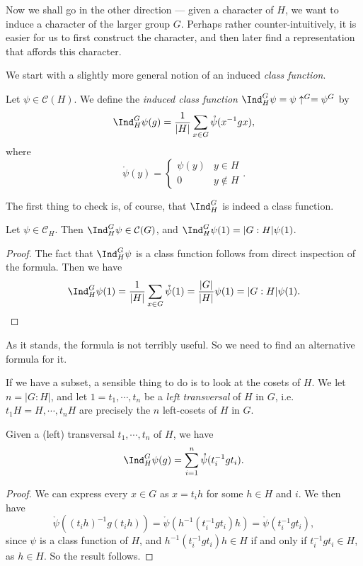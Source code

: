 \documentclass[a4paper]{article}
\begin{document}
Now we shall go in the other direction --- given a character of $H$, we want to induce a character of the larger group $G$. Perhaps rather counter-intuitively, it is easier for us to first construct the character, and then later find a representation that affords this character.

We start with a slightly more general notion of an induced \emph{class function}.
\begin{defi}
  Let $\psi \in \mathcal{C}(H)$. We define the \emph{induced class function} $\Ind^G_H \psi = \psi\uparrow^G = \psi^G$ by
  \[
    \Ind_H^G \psi(g) = \frac{1}{|H|} \sum_{x \in G} \mathring{\psi} (x^{-1}gx),
  \]
  where
  \[
    \mathring{\psi}(y) =
    \begin{cases}
      \psi(y) & y \in H\\
      0 & y \not\in H
    \end{cases}.
  \]
\end{defi}
The first thing to check is, of course, that $\Ind^G_H$ is indeed a class function.

\begin{lemma}
  Let $\psi \in \mathcal{C}_H$. Then $\Ind_H^G \psi \in \mathcal{C}(G)$, and $\Ind_H^G\psi(1) = |G:H| \psi(1)$.
\end{lemma}

\begin{proof}
  The fact that $\Ind_H^G\psi$ is a class function follows from direct inspection of the formula. Then we have
  \[
    \Ind_H^G \psi(1) = \frac{1}{|H|} \sum_{x \in G} \mathring{\psi}(1) = \frac{|G|}{|H|}\psi(1) = |G:H|\psi(1).
  \]
\end{proof}
As it stands, the formula is not terribly useful. So we need to find an alternative formula for it.

If we have a subset, a sensible thing to do is to look at the cosets of $H$. We let $n = |G:H|$, and let $1 = t_1, \cdots, t_n$ be a \emph{left transversal} of $H$ in $G$, i.e.\ $t_1 H = H, \cdots, t_n H$ are precisely the $n$ left-cosets of $H$ in $G$.

\begin{lemma}
  Given a (left) transversal $t_1, \cdots, t_n$ of $H$, we have
  \[
    \Ind_H^G\psi(g) = \sum_{i = 1}^n \mathring{\psi}(t_i^{-1} g t_i).
  \]
\end{lemma}

\begin{proof}
  We can express every $x \in G$ as $x = t_i h$ for some $h \in H$ and $i$. We then have
  \[
    \mathring{\psi}((t_i h)^{-1} g(t_i h)) = \mathring{\psi}(h^{-1} (t_i^{-1} g t_i) h) = \mathring{\psi}(t_i^{-1} gt_i),
  \]
  since $\psi$ is a class function of $H$, and $h^{-1} (t_i^{-1} g t_i) h \in H$ if and only if $t_i^{-1} g t_i \in H$, as $h \in H$. So the result follows.
\end{proof}
\end{document}
